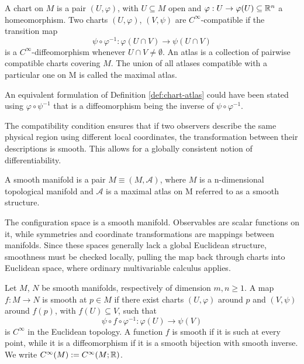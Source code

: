 \begin{definition}\label{def:chart-atlas}
	A chart on $M$ is a pair $(U,\varphi)$, with $U \subseteq M$ open and $\varphi: U \to \varphi(U) \subseteq \mathbb{R}^n$ a homeomorphism. Two charts $(U,\varphi)$, $(V,\psi)$ are $C^\infty$-compatible if the transition map
	\[
	\psi \circ \varphi^{-1} : \varphi(U \cap V) \to \psi(U \cap V)
	\]
	is a $C^\infty$-diffeomorphism whenever $U \cap V \neq \emptyset$. An atlas is a collection of pairwise compatible charts covering $M$. The union of all atlases compatible with a particular one on M is called the maximal atlas.
\end{definition}

\begin{remark}
	An equivalent formulation of Definition \ref{def:chart-atlas} could have been stated using $\varphi \circ \psi^{-1}$ that is a diffeomorphism being the inverse of $\psi \circ \varphi^{-1}$. 
\end{remark}

The compatibility condition ensures that if two observers describe the same physical region using different local coordinates, the transformation between their descriptions is smooth. This allows for a globally consistent notion of differentiability.

\begin{definition}\label{def:smooth-man}
	A smooth manifold is a pair $M \equiv (M,\mathcal{A})$, where $M$ is a n-dimensional topological manifold and $\mathcal{A}$ is a maximal atlas on M referred to as a smooth structure. 
\end{definition}

The configuration space is a smooth manifold. Observables are scalar functions on it, while symmetries and coordinate transformations are mappings between manifolds. Since these spaces generally lack a global Euclidean structure, smoothness must be checked locally, pulling the map back through charts into Euclidean space, where ordinary multivariable calculus applies.

\begin{definition}\label{def:diffeo}
	Let $M$, $N$ be smooth manifolds, respectively of dimension $m, n \geq 1$. A map $f: M \to N$ is smooth at $p \in M$ if there exist charts $(U,\varphi)$ around $p$ and $(V,\psi)$ around $f(p)$, with $f(U) \subseteq V$, such that
	\[
	\psi \circ f \circ \varphi^{-1} : \varphi(U) \to \psi(V)
	\]
	is $C^\infty$ in the Euclidean topology. A function $f$ is smooth if it is such at every point, while it is a diffeomorphism if it is a smooth bijection with smooth inverse. We write $C^\infty(M) := C^\infty(M;\mathbb{R})$.
\end{definition}
\medskip


